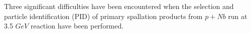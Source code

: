 % 

Three significant difficulties have been encountered when the selection and particle identification (PID)  
of primary spallation products from $p+Nb$ run at 3.5 $GeV$ reaction have been performed.



